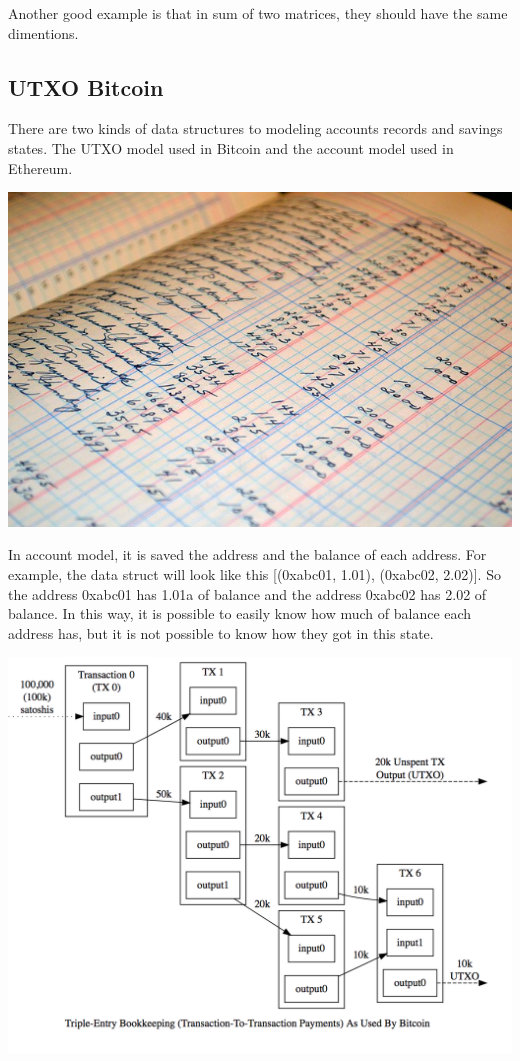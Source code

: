 \documentclass[12pt]{article}
\begin{document}
Another good example is that in sum of two matrices, they should have the same dimentions.


\subsection{UTXO Bitcoin}

There are two kinds of data structures to modeling accounts records and savings states.
The UTXO model used in Bitcoin and the account model used in Ethereum.

  \includegraphics[scale = 0.7]{imgs/account.jpeg}

In account model, it is saved the address and the balance of each address.
For example, the data struct will look like this [(0xabc01, 1.01), (0xabc02, 2.02)].
So the address 0xabc01 has 1.01a of balance and the address 0xabc02 has 2.02 of balance.
In this way, it is possible to easily know how much of balance each address has,
but it is not possible to know how they got in this state.

  \includegraphics[scale = 0.4]{imgs/utxo.png}
\end{document}
